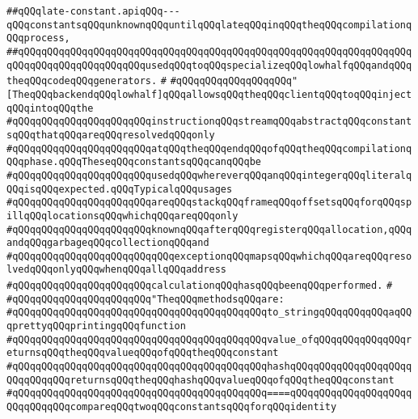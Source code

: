\label{src/lib/compiler/back/low/code/late-constant.api}
\verb|##qQQqlate-constant.apiqQQq---qQQqconstantsqQQqunknownqQQquntilqQQqlateqQQqinqQQqtheqQQqcompilationqQQqprocess,|\newline
\verb|##qQQqqQQqqQQqqQQqqQQqqQQqqQQqqQQqqQQqqQQqqQQqqQQqqQQqqQQqqQQqqQQqqQQqqQQqqQQqqQQqqQQqqQQqqQQqusedqQQqtoqQQqspecializeqQQqlowhalfqQQqandqQQqtheqQQqcodeqQQqgenerators.|\newline
\verb|#|\newline
\verb|#qQQqqQQqqQQqqQQqqQQq"[TheqQQqbackendqQQqlowhalf]qQQqallowsqQQqtheqQQqclientqQQqtoqQQqinjectqQQqintoqQQqthe|\newline
\verb|#qQQqqQQqqQQqqQQqqQQqqQQqinstructionqQQqstreamqQQqabstractqQQqconstantsqQQqthatqQQqareqQQqresolvedqQQqonly|\newline
\verb|#qQQqqQQqqQQqqQQqqQQqqQQqatqQQqtheqQQqendqQQqofqQQqtheqQQqcompilationqQQqphase.qQQqTheseqQQqconstantsqQQqcanqQQqbe|\newline
\verb|#qQQqqQQqqQQqqQQqqQQqqQQqusedqQQqwhereverqQQqanqQQqintegerqQQqliteralqQQqisqQQqexpected.qQQqTypicalqQQqusages|\newline
\verb|#qQQqqQQqqQQqqQQqqQQqqQQqareqQQqstackqQQqframeqQQqoffsetsqQQqforqQQqspillqQQqlocationsqQQqwhichqQQqareqQQqonly|\newline
\verb|#qQQqqQQqqQQqqQQqqQQqqQQqknownqQQqafterqQQqregisterqQQqallocation,qQQqandqQQqgarbageqQQqcollectionqQQqand|\newline
\verb|#qQQqqQQqqQQqqQQqqQQqqQQqqQQqexceptionqQQqmapsqQQqwhichqQQqareqQQqresolvedqQQqonlyqQQqwhenqQQqallqQQqaddress|\newline
\verb|#qQQqqQQqqQQqqQQqqQQqqQQqcalculationqQQqhasqQQqbeenqQQqperformed.|\newline
\verb|#|\newline
\verb|#qQQqqQQqqQQqqQQqqQQqqQQq"TheqQQqmethodsqQQqare:|\newline
\verb|#qQQqqQQqqQQqqQQqqQQqqQQqqQQqqQQqqQQqqQQqqQQqto_stringqQQqqQQqqQQqaqQQqprettyqQQqprintingqQQqfunction|\newline
\verb|#qQQqqQQqqQQqqQQqqQQqqQQqqQQqqQQqqQQqqQQqqQQqvalue_ofqQQqqQQqqQQqqQQqreturnsqQQqtheqQQqvalueqQQqofqQQqtheqQQqconstant|\newline
\verb|#qQQqqQQqqQQqqQQqqQQqqQQqqQQqqQQqqQQqqQQqqQQqhashqQQqqQQqqQQqqQQqqQQqqQQqqQQqqQQqreturnsqQQqtheqQQqhashqQQqvalueqQQqofqQQqtheqQQqconstant|\newline
\verb|#qQQqqQQqqQQqqQQqqQQqqQQqqQQqqQQqqQQqqQQqqQQq====qQQqqQQqqQQqqQQqqQQqqQQqqQQqqQQqcompareqQQqtwoqQQqconstantsqQQqforqQQqidentity|\newline
